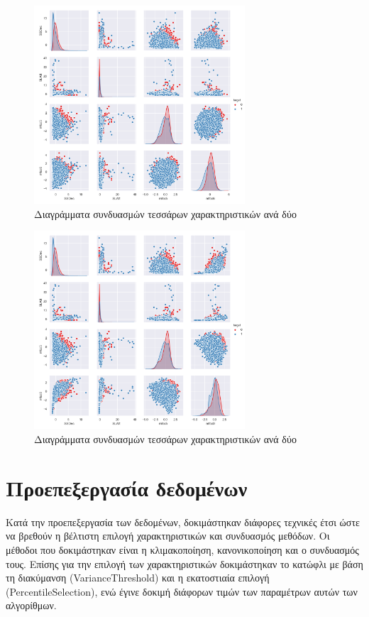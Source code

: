 \begin{figure}[h]
\centering
\includegraphics[width=0.7\textwidth]{res/figure_1.png}
\caption{Διαγράμματα συνδυασμών τεσσάρων χαρακτηριστικών ανά δύο}
\label{featureTable:table1}
\end{figure}
\begin{figure}[ht]
\centering
\includegraphics[width=0.7\textwidth]{res/figure_2.png}
\caption{Διαγράμματα συνδυασμών τεσσάρων χαρακτηριστικών ανά δύο}
\label{featureTable:table2}
\end{figure}

\section{Προεπεξεργασία δεδομένων}

Κατά την προεπεξεργασία των δεδομένων, δοκιμάστηκαν διάφορες τεχνικές έτσι ώστε να βρεθούν η βέλτιστη επιλογή χαρακτηριστικών και συνδυασμός μεθόδων. Οι μέθοδοι που δοκιμάστηκαν είναι η κλιμακοποίηση, κανονικοποίηση και ο συνδυασμός τους. Επίσης για την επιλογή των χαρακτηριστικών δοκιμάστηκαν το κατώφλι με βάση τη διακύμανση (VarianceThreshold) και η εκατοστιαία επιλογή (PercentileSelection), ενώ έγινε δοκιμή διάφορων τιμών των παραμέτρων αυτών των αλγορίθμων.

